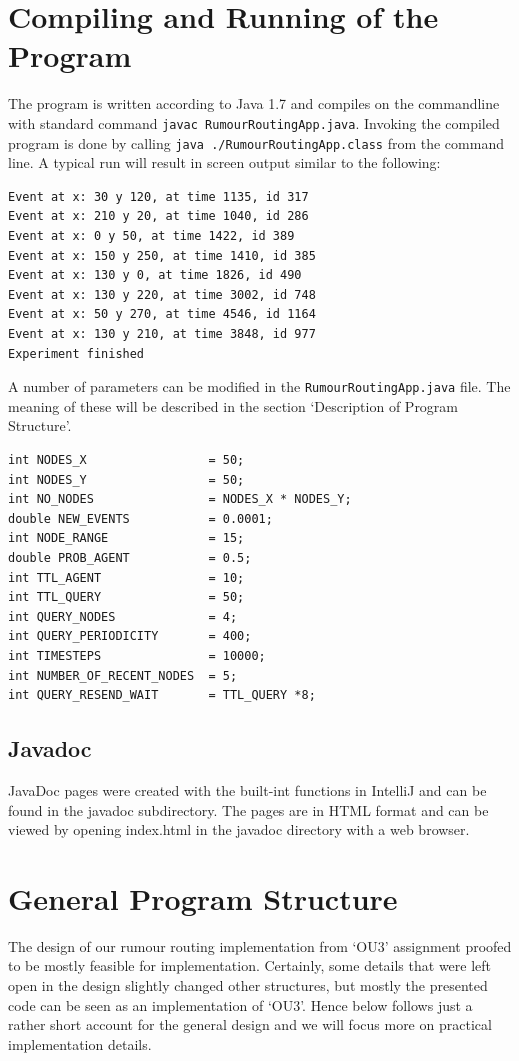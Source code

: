 \documentclass[a4paper,11pt,twoside]{article}
\begin{document}
\section{Compiling and Running of the Program}

The program is written according to Java 1.7 and compiles on the
commandline with standard command \texttt{javac RumourRoutingApp.java}.
Invoking the compiled program is done by calling \texttt{java
  ./RumourRoutingApp.class} from the command line.
A typical run will result in screen output similar to the following:
\begin{verbatim}
Event at x: 30 y 120, at time 1135, id 317
Event at x: 210 y 20, at time 1040, id 286
Event at x: 0 y 50, at time 1422, id 389
Event at x: 150 y 250, at time 1410, id 385
Event at x: 130 y 0, at time 1826, id 490
Event at x: 130 y 220, at time 3002, id 748
Event at x: 50 y 270, at time 4546, id 1164
Event at x: 130 y 210, at time 3848, id 977
Experiment finished
\end{verbatim}

A number of parameters can be modified in the
\texttt{RumourRoutingApp.java} file. The meaning of these will be
described in the section `Description of Program Structure'.
\begin{verbatim}
int NODES_X                 = 50;
int NODES_Y                 = 50;
int NO_NODES                = NODES_X * NODES_Y;
double NEW_EVENTS           = 0.0001;
int NODE_RANGE              = 15;
double PROB_AGENT           = 0.5;
int TTL_AGENT               = 10;
int TTL_QUERY               = 50;
int QUERY_NODES             = 4;
int QUERY_PERIODICITY       = 400;
int TIMESTEPS               = 10000;
int NUMBER_OF_RECENT_NODES  = 5;
int QUERY_RESEND_WAIT       = TTL_QUERY *8;
\end{verbatim}



\subsection{Javadoc}
JavaDoc pages were created with the built-int functions in IntelliJ
and can be found in the javadoc subdirectory. The pages are in HTML
format and can be viewed by opening index.html in the javadoc
directory with a web browser.



\section{General Program Structure}
The design of our rumour routing implementation from `OU3' assignment
proofed to be mostly feasible for implementation. Certainly, some
details that were left open in the design slightly changed other
structures, but mostly the presented code can be seen as
an implementation of `OU3'. Hence below follows just a rather short
account for the general design and we will focus more on practical
implementation details.
\end{document}
